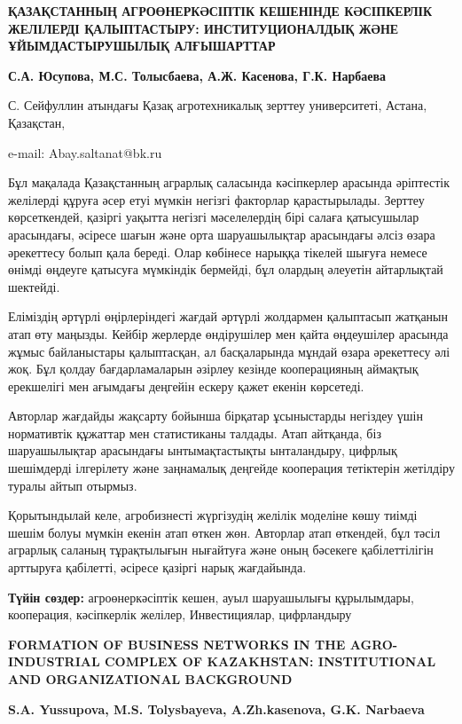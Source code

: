 \begin{articleheader}
{\bfseries ҚАЗАҚСТАННЫҢ АГРОӨНЕРКӘСІПТІК КЕШЕНІНДЕ КӘСІПКЕРЛІК ЖЕЛІЛЕРДІ ҚАЛЫПТАСТЫРУ: ИНСТИТУЦИОНАЛДЫҚ ЖӘНЕ ҰЙЫМДАСТЫРУШЫЛЫҚ АЛҒЫШАРТТАР}

{\bfseries
С.А. Юсупова,
М.С. Толысбаева,
А.Ж. Касенова,
Г.К. Нарбаева
}
\end{articleheader}

\begin{affiliation}
С. Сейфуллин атындағы Қазақ агротехникалық зерттеу университеті, Астана, Қазақстан,

e-mail: Abay.saltanat@bk.ru
\end{affiliation}

Бұл мақалада Қазақстанның аграрлық саласында кәсіпкерлер арасында
әріптестік желілерді құруға әсер етуі мүмкін негізгі факторлар
қарастырылады. Зерттеу көрсеткендей, қазіргі уақытта негізгі
мәселелердің бірі салаға қатысушылар арасындағы, әсіресе шағын және орта
шаруашылықтар арасындағы әлсіз өзара әрекеттесу болып қала береді. Олар
көбінесе нарыққа тікелей шығуға немесе өнімді өңдеуге қатысуға мүмкіндік
бермейді, бұл олардың әлеуетін айтарлықтай шектейді.

Еліміздің әртүрлі өңірлеріндегі жағдай әртүрлі жолдармен қалыптасып
жатқанын атап өту маңызды. Кейбір жерлерде өндірушілер мен қайта
өңдеушілер арасында жұмыс байланыстары қалыптасқан, ал басқаларында
мұндай өзара әрекеттесу әлі жоқ. Бұл қолдау бағдарламаларын әзірлеу
кезінде кооперацияның аймақтық ерекшелігі мен ағымдағы деңгейін ескеру
қажет екенін көрсетеді.

Авторлар жағдайды жақсарту бойынша бірқатар ұсыныстарды негіздеу үшін
нормативтік құжаттар мен статистиканы талдады. Атап айтқанда, біз
шаруашылықтар арасындағы ынтымақтастықты ынталандыру, цифрлық шешімдерді
ілгерілету және заңнамалық деңгейде кооперация тетіктерін жетілдіру
туралы айтып отырмыз.

Қорытындылай келе, агробизнесті жүргізудің желілік моделіне көшу тиімді
шешім болуы мүмкін екенін атап өткен жөн. Авторлар атап өткендей, бұл
тәсіл аграрлық саланың тұрақтылығын нығайтуға және оның бәсекеге
қабілеттілігін арттыруға қабілетті, әсіресе қазіргі нарық жағдайында.

{\bfseries Түйін сөздер:} агроөнеркәсіптік кешен, ауыл шаруашылығы
құрылымдары, кооперация, кәсіпкерлік желілер, Инвестициялар, цифрландыру

\begin{articleheader}
{\bfseries FORMATION OF BUSINESS NETWORKS IN THE AGRO-INDUSTRIAL COMPLEX OF KAZAKHSTAN: INSTITUTIONAL AND ORGANIZATIONAL BACKGROUND}

{\bfseries
S.A. Yussupova,
M.S. Tolysbayeva,
A.Zh.kasenova,
G.K. Narbaeva
}
\end{articleheader}

